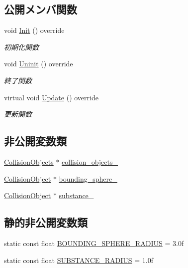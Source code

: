 \subsection*{公開メンバ関数}
\begin{DoxyCompactItemize}
\item 
void \mbox{\hyperlink{class_goal_collision_ab6089638f5390e019a55ae11952e1cf9}{Init}} () override
\begin{DoxyCompactList}\small\item\em 初期化関数 \end{DoxyCompactList}\item 
void \mbox{\hyperlink{class_goal_collision_ab818bad44ffcd595f1c495e659c0b348}{Uninit}} () override
\begin{DoxyCompactList}\small\item\em 終了関数 \end{DoxyCompactList}\item 
virtual void \mbox{\hyperlink{class_goal_collision_a1e3995dc2f5ba2678580d06699ca6936}{Update}} () override
\begin{DoxyCompactList}\small\item\em 更新関数 \end{DoxyCompactList}\end{DoxyCompactItemize}
\subsection*{非公開変数類}
\begin{DoxyCompactItemize}
\item 
\mbox{\hyperlink{class_collision_objects}{Collision\+Objects}} $\ast$ \mbox{\hyperlink{class_goal_collision_ae04c3bbf4fd5e382b63443466a8cc141}{collision\+\_\+objects\+\_\+}}
\item 
\mbox{\hyperlink{class_collision_object}{Collision\+Object}} $\ast$ \mbox{\hyperlink{class_goal_collision_a584c7b2e79411a9fb86fe03f0235ea02}{bounding\+\_\+sphere\+\_\+}}
\item 
\mbox{\hyperlink{class_collision_object}{Collision\+Object}} $\ast$ \mbox{\hyperlink{class_goal_collision_a8fa4a9b7ed96d453d4615641073937bb}{substance\+\_\+}}
\end{DoxyCompactItemize}
\subsection*{静的非公開変数類}
\begin{DoxyCompactItemize}
\item 
static const float \mbox{\hyperlink{class_goal_collision_ad2a608feb369a4d10d8ab06ebc656959}{B\+O\+U\+N\+D\+I\+N\+G\+\_\+\+S\+P\+H\+E\+R\+E\+\_\+\+R\+A\+D\+I\+US}} = 3.\+0f
\item 
static const float \mbox{\hyperlink{class_goal_collision_a6eb0dff2f8f77b38067eee8b22cce08a}{S\+U\+B\+S\+T\+A\+N\+C\+E\+\_\+\+R\+A\+D\+I\+US}} = 1.\+0f
\end{DoxyCompactItemize}


